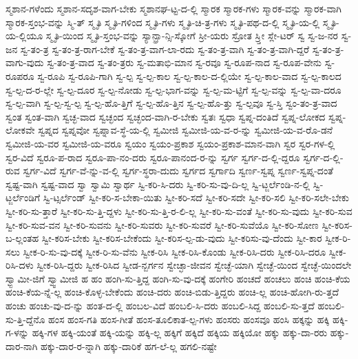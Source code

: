 {ಸ್ಮಶಾನ-ಗಳೆಂದು
ಸ್ಮಶಾನ-ಸದೃಶ-ವಾಗ-ಬೇಕು
ಸ್ಮಶಾನಘ-ಟ್ಟ-ದ-ಲ್ಲಿ
ಸ್ಮಾರಕ
ಸ್ಮಾರಕ-ಗಳು
ಸ್ಮಾರಕ-ವನ್ನು
ಸ್ಮಾರಕ-ವಾಗಿ
ಸ್ಮಾರಕ-ಸ್ತಂಭ-ವನ್ನು
ಸ್ಮಿ-ತ್
ಸ್ಮೃತಿ
ಸ್ಮೃತಿ-ಗಳಿಂದ
ಸ್ಮೃತಿ-ಗಳು
ಸ್ಮೃತಿ-ಚಿ-ತ್ರ-ಗಳು
ಸ್ಮೃತಿ-ಪಥ-ದ-ಲ್ಲಿ
ಸ್ಮೃತಿ-ಯ-ಲ್ಲಿ
ಸ್ಮೃತಿ-ಯ-ಲ್ಲಿಯೂ
ಸ್ಮೃತಿ-ಯಿಂದ
ಸ್ಮೃತಿ-ಸ್ತಂಭ-ವನ್ನು
ಸ್ಯಾನ್ಫ್ರಾ-ನ್ಸಿ-ಸ್ಕೋಗೆ
ಸ್ರೀ-ಯರು
ಸ್ರೋತ
ಸ್ರ್ತೀ
ಸ್ಲೇ-ಟರ್
ಸ್ವ
ಸ್ವ-ಜ-ನರ
ಸ್ವ-ಜನ
ಸ್ವ-ತಂ-ತ್ರ
ಸ್ವ-ತಂ-ತ್ರ-ರಾಗ-ಬೇಕೆ
ಸ್ವ-ತಂ-ತ್ರ-ವಾಗ-ಲಾ-ರದು
ಸ್ವ-ತಂ-ತ್ರ-ವಾಗಿ
ಸ್ವ-ತಂ-ತ್ರ-ವಾಗಿ-ದ್ದರೆ
ಸ್ವ-ತಂ-ತ್ರ-ವಾಗು-ವುದು
ಸ್ವ-ತಂ-ತ್ರ-ವಾದ
ಸ್ವ-ತಂ-ತ್ರರು
ಸ್ವ-ಮತಾಭಿ-ಮಾನ
ಸ್ವ-ರವೂ
ಸ್ವ-ರೂಪ-ನಾದ
ಸ್ವ-ರೂಪ-ವೇನು
ಸ್ವ-ರೂಪರೂ
ಸ್ವ-ರೂಪಿ
ಸ್ವ-ರೂಪಿ-ಗಾಗಿ
ಸ್ವ-ಲ್ಪ
ಸ್ವ-ಲ್ಪ-ಕಾಲ
ಸ್ವ-ಲ್ಪ-ಕಾಲ-ದ-ಲ್ಲಿಯೇ
ಸ್ವ-ಲ್ಪ-ಕಾಲ-ವಾದ
ಸ್ವ-ಲ್ಪ-ಕಾಲದ
ಸ್ವ-ಲ್ಪ-ದ-ರ-ಲ್ಲೇ
ಸ್ವ-ಲ್ಪ-ದೂರ
ಸ್ವ-ಲ್ಪ-ನೋಡು
ಸ್ವ-ಲ್ಪ-ಭಾಗ-ವನ್ನು
ಸ್ವ-ಲ್ಪ-ಮ-ಟ್ಟಿಗೆ
ಸ್ವ-ಲ್ಪ-ವನ್ನು
ಸ್ವ-ಲ್ಪ-ವಾ-ದರೂ
ಸ್ವ-ಲ್ಪ-ವಾಗಿ
ಸ್ವ-ಲ್ಪ-ಸ್ವ-ಲ್ಪ
ಸ್ವ-ಲ್ಪ-ಹೊ-ತ್ತಿಗೆ
ಸ್ವ-ಲ್ಪ-ಹೊ-ತ್ತಿನ
ಸ್ವ-ಲ್ಪ-ಹೊ-ತ್ತು
ಸ್ವ-ಲ್ಪವೂ
ಸ್ವ-ಸ್ತಿ
ಸ್ವಂ-ತಂ-ತ್ರ-ವಾದ
ಸ್ವಂತ
ಸ್ವಂತ-ವಾಗಿ
ಸ್ವಚ್ಛ-ವಾದ
ಸ್ವಚ್ಛಂದ
ಸ್ವಚ್ಛಂದ-ವಾಗಿ-ರ-ಬೇಕು
ಸ್ವತಃ
ಸ್ವಧಾ
ಸ್ವಪ್ನ-ದಂತಿದೆ
ಸ್ವಪ್ನ-ಲೋಕದ
ಸ್ವಪ್ನ-ಲೋಕವೇ
ಸ್ವಪ್ನದ
ಸ್ವಪ್ನವೋ
ಸ್ವಪ್ನಾವ-ಸ್ಥೆ-ಯ-ಲ್ಲಿ
ಸ್ವಮೀಜಿ
ಸ್ವಮೀಜಿ-ಯ-ವ-ರ-ನ್ನು
ಸ್ವಮೀಜಿ-ಯ-ವ-ರೊ-ಡನೆ
ಸ್ವಮೀಜಿ-ಯ-ವರ
ಸ್ವಮೀಜಿ-ಯ-ವರೂ
ಸ್ವಯಂ
ಸ್ವಯಂ-ಪ್ರಕಾಶ
ಸ್ವಯಂ-ಪ್ರಕಾಶ-ಮಾನ-ವಾಗಿ
ಸ್ವರ
ಸ್ವರ-ಗಳ-ಲ್ಲಿ
ಸ್ವರ-ವಿದೆ
ಸ್ವರೂ-ಪ-ರಾದ
ಸ್ವರೂ-ಪಾ-ನಂ-ದರು
ಸ್ವರೂ-ಪಾನಂದ-ರ-ನ್ನು
ಸ್ವರ್ಗ
ಸ್ವರ್ಗ-ದ-ಲ್ಲಿ-ದ್ದರೂ
ಸ್ವರ್ಗ-ದ-ಲ್ಲಿ-ರುವ
ಸ್ವರ್ಗ-ವಿದೆ
ಸ್ವರ್ಗ-ವೆ-ನ್ನು-ವ-ಲ್ಲಿ
ಸ್ವರ್ಗ-ಸ್ಥರಾ-ದುದು
ಸ್ವರ್ಗದ
ಸ್ವರ್ಗಾದಿ
ಸ್ವರ್ಣ-ಸ್ವಪ್ನ
ಸ್ವರ್ಣ-ಸ್ವಪ್ನ-ದಂತೆ
ಸ್ವಷ್ಟ-ವಾಗಿ
ಸ್ವಷ್ಟ-ವಾದ
ಸ್ವಾ
ಸ್ವಾಮಿ
ಸ್ವಾರ್ಥ
ಸ್ವಿ-ಕರಿ-ಸಿ-ದರು
ಸ್ವಿ-ಕರಿ-ಸು-ವು-ದಿ-ಲ್ಲ
ಸ್ವಿ-ಟ್ಜರ್ಲೆಂಡಿ-ನ-ಲ್ಲಿ
ಸ್ವಿ-ಟ್ಜರ್ಲೆಂಡಿಗೆ
ಸ್ವಿ-ಟ್ಸರ್ಲೆಂಡ್
ಸ್ವೀ-ಕರಿ-ಸ-ಬೇಕಾ-ಯಿತು
ಸ್ವೀ-ಕರಿ-ಸದೆ
ಸ್ವೀ-ಕರಿ-ಸದೇ
ಸ್ವೀ-ಕರಿ-ಸಲಿ
ಸ್ವೀ-ಕರಿ-ಸಲೇ-ಬೇಕು
ಸ್ವೀ-ಕರಿ-ಸು-ತ್ತಾರೆ
ಸ್ವೀ-ಕರಿ-ಸು-ತ್ತಿ-ದ್ದಳು
ಸ್ವೀ-ಕರಿ-ಸು-ತ್ತಿ-ರ-ಲಿ-ಲ್ಲ
ಸ್ವೀ-ಕರಿ-ಸು-ವಂತೆ
ಸ್ವೀ-ಕರಿ-ಸು-ವುದು
ಸ್ವೀ-ಕರಿ-ಸುವ
ಸ್ವೀ-ಕರಿ-ಸುವ-ವನ
ಸ್ವೀ-ಕರಿ-ಸುವನು
ಸ್ವೀ-ಕರಿ-ಸುವರು
ಸ್ವೀ-ಕರಿ-ಸುವರೆ
ಸ್ವೀ-ಕರಿ-ಸುವೆಯೊ
ಸ್ವೀ-ಕರಿ-ಸೋಣ
ಸ್ವೀ-ಕರಿಸ-ಬ-ಲ್ಲಂತಹ
ಸ್ವೀ-ಕರಿಸ-ಬೇಕು
ಸ್ವೀ-ಕರಿಸ-ಬೇಕೆಂದು
ಸ್ವೀ-ಕರಿಸ-ಲ್ಪ-ಡು-ವುದು
ಸ್ವೀ-ಕರಿಸು-ವು-ದೆಂದು
ಸ್ವೀ-ಕಾರ
ಸ್ವೀಕ-ರಿ-ಸಲು
ಸ್ವೀಕ-ರಿ-ಸು-ವು-ದಕ್ಕೆ
ಸ್ವೀಕ-ರಿ-ಸು-ವೆನು
ಸ್ವೀಕ-ರಿಸಿ
ಸ್ವೀಕ-ರಿಸಿ-ಕೊಂಡು
ಸ್ವೀಕ-ರಿಸಿ-ದರು
ಸ್ವೀಕ-ರಿಸಿ-ದರೂ
ಸ್ವೀಕ-ರಿಸಿ-ದಳು
ಸ್ವೀಕ-ರಿಸಿ-ದ್ದರು
ಸ್ವೀಕ-ರಿಸಿದ
ಸ್ವೀಡ-ನ್ಬರ್ಗನ
ಸ್ವೇಚ್ಛಾ-ಜೀವನ
ಸ್ವೇಚ್ಛೆ-ಯಾಗಿ
ಸ್ವೇಚ್ಛೆ-ಯಿಂದ
ಸ್ವೇಚ್ಛೆ-ಯಿಂದಲೇ
ಸ್ವ್ಬಾಮೀ-ಜಿಗೆ
ಸ್ವ್ವಾಮೀಜಿ
ಹ
ಹಂ
ಹಂಗಿ-ಸು-ತ್ತಿದ್ದ
ಹಂಗಿ-ಸು-ವು-ದಕ್ಕೆ
ಹಂಗೇರಿ
ಹಂಚದೆ
ಹಂಚಲು
ಹಂಚಿ
ಹಂಚಿ-ಕೆಯ
ಹಂಚಿ-ಕೆಯ-ನ್ನೆ-ಲ್ಲ
ಹಂಚಿ-ಕೊಳ್ಳ-ಬೇಕೆಂದು
ಹಂಚಿ-ದರು
ಹಂಚಿ-ಬಿಡು-ತ್ತಿದ್ದರು
ಹಂಚಿ-ಲ್ಲ
ಹಂಚಿ-ಹೋಗಿ-ರು-ತ್ತದೆ
ಹಂಚು
ಹಂಚು-ವು-ದ-ನ್ನು
ಹಂತ-ದ-ಲ್ಲಿ
ಹಂಬಲ-ವಿದೆ
ಹಂಬಲಿ-ಸಿ-ದರು
ಹಂಬಲಿ-ಸಿದ್ದ
ಹಂಬಲಿ-ಸು-ತ್ತದೆ
ಹಂಬಲಿ-ಸು-ತ್ತಿ-ದ್ದೆನೊ
ಹಂಸ
ಹಂಸ-ಗತಿ
ಹಂಸ-ಗೀತೆ
ಹಂಸ-ತೂಲಿಕಾತ-ಲ್ಪ-ಗಳು
ಹಂಸರು
ಹಂಸವೂ
ಹಂಸಿ
ಹಕ್ಕನ್ನು
ಹಕ್ಕಿ
ಹಕ್ಕಿ-ಗ-ಳನ್ನು
ಹಕ್ಕಿ-ಗಳ
ಹಕ್ಕಿ-ಯಂತೆ
ಹಕ್ಕಿ-ಯನ್ನು
ಹಕ್ಕಿ-ಲ್ಲ
ಹಕ್ಕಿಗೆ
ಹಕ್ಕಿದೆ
ಹಕ್ಕಿಯ
ಹಕ್ಕಿಯೋ
ಹಕ್ಕು
ಹಕ್ಕು-ದಾ-ರರು
ಹಕ್ಕು-ದಾರ-ನಾಗಿ
ಹಕ್ಕು-ದಾರ-ರ-ನ್ನಾಗಿ
ಹಕ್ಕು-ದಾರಿಕೆ
ಹಗ-ಲೆ-ಲ್ಲ
ಹಗಲಿ-ನಷ್ಟೇ
}
